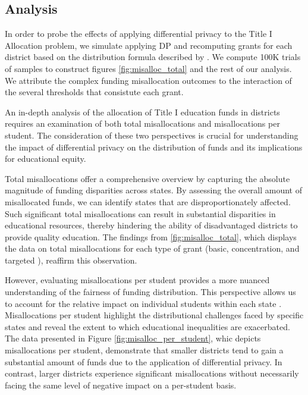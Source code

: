 \subsection*{Analysis}
In order to probe the effects of applying differential privacy to the Title I Allocation problem, we simulate
applying DP and recomputing grants for each district based on the distribution formula described by \cite{Sonnenberg
:16}. We compute 100K trials of samples to construct figures \ref{fig:misalloc_total} and the rest of our analysis.
We attribute the complex funding misallocation outcomes to the interaction of the several thresholds that consistute
each grant.

An in-depth analysis of the allocation of Title I education funds in districts requires an examination of both total
misallocations and misallocations per student. The consideration of these two perspectives is crucial for
understanding the impact of differential privacy on the distribution of funds and its implications for educational
equity.

Total misallocations offer a comprehensive overview by capturing the absolute magnitude of funding disparities across
states. By assessing the overall amount of misallocated funds, we can identify states that are disproportionately
affected. Such significant total misallocations can result in substantial disparities in educational resources,
thereby hindering the ability of disadvantaged districts to provide quality education. The findings from \ref{fig:misalloc_total},
which displays the data on total misallocations for each type of grant (basic, concentration, and targeted
), reaffirm this observation.

However, evaluating misallocations per student provides a more nuanced understanding of the fairness of funding
distribution. This perspective allows us to account for the relative impact on individual students within each state
. Misallocations per student highlight the distributional challenges faced by specific states and reveal the extent
to which educational inequalities are exacerbated. The data presented in Figure \ref{fig:misalloc_per_student}, whic
depicts misallocations per student, demonstrate that smaller districts tend to gain a substantial amount of funds
due to the application of differential privacy. In contrast, larger districts experience significant misallocations
without necessarily facing the same level of negative impact on a per-student basis.


